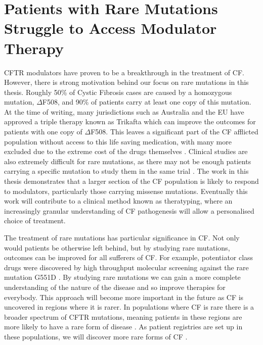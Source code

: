 \section{Patients with Rare Mutations Struggle to Access Modulator Therapy}
CFTR modulators have proven to be a breakthrough in the treatment of CF. However, there is strong motivation behind our focus on rare mutations in this thesis. Roughly 50\% of Cystic Fibrosis cases are caused by a homozygous mutation, $\Delta$F508, and 90\% of patients carry at least one copy of this mutation. At the time of writing, many jurisdictions such as Australia and the EU have approved a triple therapy known as Trikafta which can improve the outcomes for patients with one copy of $\Delta$F508. This leaves a significant part of the CF afflicted population without access to this life saving medication, with many more excluded due to the extreme cost of the drugs themselves \cite{administration2021, trikafta_website, abdallah2021, guo2022a}. Clinical studies are also extremely difficult for rare mutations, as there may not be enough patients carrying a specific mutation to study them in the same trial \cite{grody2007}. The work in this thesis demonstrates that a larger section of the CF population is likely to respond to modulators, particularly those carrying missense mutations. Eventually this work will contribute to a clinical method known as theratyping, where an increasingly granular understanding of CF pathogenesis will allow a personalised choice of treatment.

The treatment of rare mutations has particular significance in CF. Not only would patients be otherwise left behind, but by studying rare mutations, outcomes can be improved for all sufferers of CF. For example, potentiator class drugs were discovered by high throughput molecular screening against the rare mutation G551D \cite{vangoor2009}. By studying rare mutations we can gain a more complete understanding of the nature of the disease and so improve therapies for everybody. This approach will become more important in the future as CF is uncovered in regions where it is rarer.  In populations where CF is rare there is a broader spectrum of CFTR mutations, meaning patients in these regions are more likely to have a rare form of disease \cite{singh2015,zheng2017,ni2022}. As patient registries are set up in these populations, we will discover more rare forms of CF \cite{zheng2017}. 


